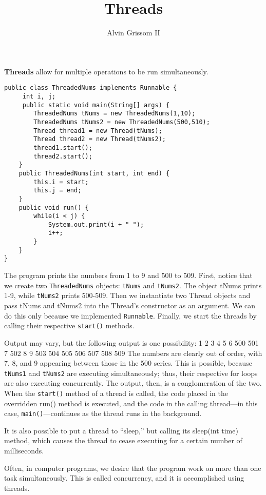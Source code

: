 \documentclass[12pt]{article}
\title{Threads}
\author{Alvin Grissom II}
\begin{document}
\maketitle

\textbf{Threads} allow for multiple operations to be run simultaneously.
\begin{verbatim}
public class ThreadedNums implements Runnable {
     int i, j;
     public static void main(String[] args) {
        ThreadedNums tNums = new ThreadedNums(1,10);
        ThreadedNums tNums2 = new ThreadedNums(500,510);
        Thread thread1 = new Thread(tNums);
        Thread thread2 = new Thread(tNums2);
        thread1.start();
        thread2.start();
    }
    public ThreadedNums(int start, int end) {
        this.i = start;
        this.j = end;
    }
    public void run() {
        while(i < j) {
            System.out.print(i + " ");
            i++;
        }
    }
}
\end{verbatim}
The program prints the numbers from 1 to 9 and 500 to 509.  First,
notice that we create two \texttt{ThreadedNums} objects:
\texttt{tNums} and \texttt{tNums2}.  The object tNums prints 1-9,
while \texttt{tNums2} prints 500-509.  Then we instantiate two Thread
objects and pass tNums and tNums2 into the Thread's constructor as an
argument.  We can do this only because we implemented
\texttt{Runnable}.  Finally, we start the threads by calling their
respective \texttt{start()} methods.

Output may vary, but the following output is one possibility: 1 2 3 4
5 6 500 501 7 502 8 9 503 504 505 506 507 508 509 The numbers are
clearly out of order, with 7, 8, and 9 appearing between those in the
500 series.  This is possible, because \texttt{tNums1} and
\texttt{tNums2} are executing simultaneously; thus, their respective
for loops are also executing concurrently.  The output, then, is a
conglomeration of the two.  When the \texttt{start()} method of a
thread is called, the code placed in the overridden run() method is
executed, and the code in the calling thread---in this case,
\texttt{main()}---continues as the thread runs in the background.

It is also possible to put a thread to ``sleep,'' but calling its
sleep(int time) method, which causes the thread to cease executing for
a certain number of milliseconds.

Often, in computer programs, we desire that the program work on more
than one task simultaneously.  This is called concurrency, and it is
accomplished using threads.
\end{document}
